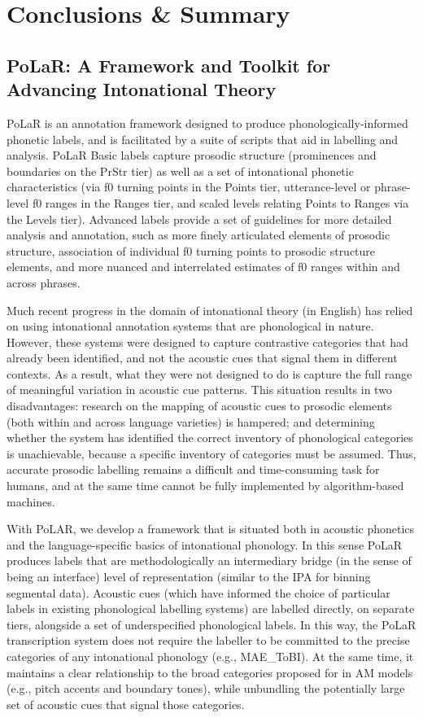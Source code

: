 \chapter{Conclusions \& Summary}
\section*{PoLaR: A Framework and Toolkit for Advancing Intonational Theory}
PoLaR is an annotation framework designed to produce phonologically-informed phonetic labels, and is facilitated by a suite of scripts that aid in labelling and analysis. PoLaR Basic labels capture prosodic structure (prominences and boundaries on the PrStr tier) as well as a set of intonational phonetic characteristics (via f0 turning points in the Points tier, utterance-level or phrase-level f0 ranges in the Ranges tier, and scaled levels relating Points to Ranges via the Levels tier). Advanced labels provide a set of guidelines for more detailed analysis and annotation, such as more finely articulated elements of prosodic structure, association of individual f0 turning points to prosodic structure elements, and more nuanced and interrelated estimates of f0 ranges within and across phrases.

Much recent progress in the domain of intonational theory (in English) has relied on using intonational annotation systems that are phonological in nature.  However, these systems were designed to capture contrastive categories that had already been identified, and not the acoustic cues that signal them in different contexts.  As a result, what they were not designed to do is capture the full range of meaningful variation in acoustic cue patterns. This situation results in two disadvantages: research on the mapping of acoustic cues to prosodic elements (both within and across language varieties) is hampered; and determining whether the system has identified the correct inventory of phonological categories is unachievable, because a specific inventory of categories must be assumed. Thus, accurate prosodic labelling remains a difficult and time-consuming task for humans, and at the same time cannot be fully implemented by algorithm-based machines.

With PoLAR, we develop a framework that is situated both in acoustic phonetics and the language-specific basics of intonational phonology. In this sense PoLaR produces labels that are methodologically an intermediary bridge (in the sense of being an interface) level of representation (similar to the IPA for binning segmental data). Acoustic cues (which have informed the choice of particular labels in existing phonological labelling systems) are labelled directly, on separate tiers, alongside a set of underspecified phonological labels. In this way, the PoLaR transcription system does not require the labeller to be committed to the precise categories of any intonational phonology (e.g., MAE\_ToBI). At the same time, it maintains a clear relationship to the broad categories proposed for in AM models (e.g., pitch accents and boundary tones), while unbundling the potentially large set of acoustic cues that signal those categories.

